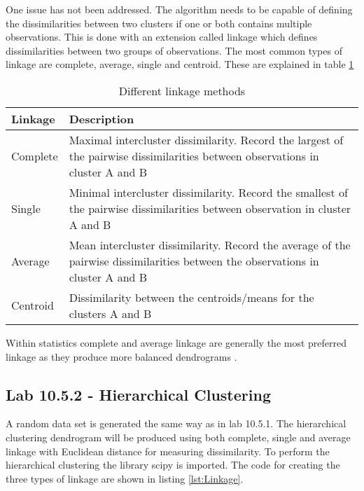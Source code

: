 One issue has not been addressed. The algorithm needs to be capable of defining the dissimilarities between two clusters if one or both contains multiple observations. This is done with an extension called linkage which defines dissimilarities between two groups of observations. The most common types of linkage are complete, average, single and
centroid. These are explained in table \ref{table:linkage}

\begin{table}
	\begin{center}
		\begin{tabular}{ | l | p{12cm} |}
			\hline
			Linkage & Description \\ \hline
			Complete & Maximal intercluster dissimilarity. Record the largest of the pairwise dissimilarities between observations in cluster A and B \\ \hline
			Single & Minimal intercluster dissimilarity. Record the smallest of the pairwise dissimilarities between observation in cluster A and B \\ \hline
			Average & Mean intercluster dissimilarity. Record the average of the pairwise dissimilarities between the observations in cluster A and B\\
			\hline
			Centroid & Dissimilarity between the centroids/means for the clusters A and B
			\\
			\hline
		\end{tabular}
	\end{center}
	\caption{Different linkage methods}
	\label{table:linkage}
\end{table}


Within statistics complete and average linkage are generally the most preferred linkage as they produce more balanced dendrograms \citep[pp. 394-395]{ISLR}. 


\subsection{Lab 10.5.2 - Hierarchical Clustering}
A random data set is generated the same way as in lab 10.5.1.
The hierarchical clustering dendrogram will be produced using both complete, single and average linkage with Euclidean distance for measuring dissimilarity.
To perform the hierarchical clustering the library scipy is imported.
The code for creating the three types of linkage are shown in listing \ref{lst:Linkage}.

